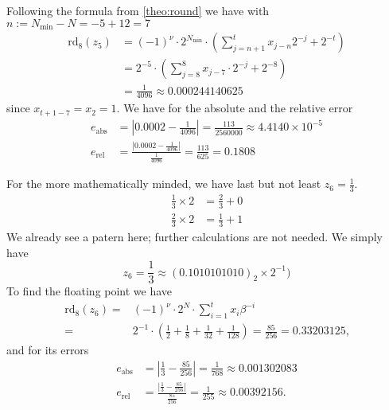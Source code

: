 \begin{exmp}
\begin{equation*}
    \end{equation*}
    Following the formula from \ref{theo:round} we have with \(n := N_{\text{min}} - N = -5 + 12 = 7\)
    \begin{align*}
        \text{rd}_8(z_5) &= (-1)^{\nu} \cdot 2^{N_\text{min}} \cdot \left( \sum_{j = n + 1}^{t} x_{j-n}2^{-j} + 2^{-t} \right) \\
        &= 2^{-5} \cdot \left(\sum_{j = 8}^8 x_{j-7} \cdot 2^{-j} + 2^{-8} \right) \\
        &= \frac{1}{4096} \approx 0.000244140625
    \end{align*}
    since \(x_{t + 1 - 7} = x_2 = 1\).
    We have for the absolute and the relative error
    \begin{align*}
        e_{\text{abs}} &= \left| 0.0002 - \frac{1}{4096} \right| = \frac{113}{2560000} \approx 4.4140 \times 10^{-5} \\
        e_{\text{rel}} &= \frac{\left| 0.0002 - \frac{1}{4096} \right|}{\frac{1}{4096}} = \frac{113}{625} = 0.1808
    \end{align*}
\end{exmp}
\begin{exmp}
    For the more mathematically minded, we have last but not least \(z_6 = \frac{1}{3}\).
    \begin{align*}
        \frac{1}{3} \times 2 &= \frac{2}{3} + 0 \\
        \frac{2}{3} \times 2 &= \frac{1}{3} + 1
    \end{align*}
    We already see a patern here; further calculations are not needed. We simply have
    \begin{equation*}
        z_6 = \frac{1}{3} \approx (0.1010101010)_2 \times 2^{-1})
    \end{equation*}
    To find the floating point we have
    \begin{align*}
        \text{rd}_8(z_6) =& (-1)^{\nu} \cdot 2^N \cdot \sum_{i=1}^{t}x_i \beta^{-i} \\
        =& 2^{-1} \cdot \left(\frac{1}{2} + \frac{1}{8} + \frac{1}{32} + \frac{1}{128} \right) = \frac{85}{256} = 0.33203125 \text{,}
    \end{align*}
    and for its errors
    \begin{align*}
        e_{\text{abs}} &= \left| \frac{1}{3} - \frac{85}{256} \right| = \frac{1}{768} \approx 0.001302083 \\
        e_{\text{rel}} &= \frac{\left| \frac{1}{3} - \frac{85}{256} \right|}{\frac{85}{256}} = \frac{1}{255} \approx 0.00392156 \text{.}
    \end{align*}
\end{exmp}

